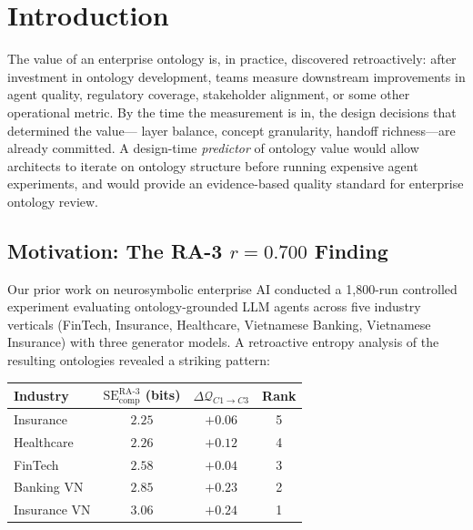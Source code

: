 \documentclass[11pt,a4paper]{article}
\newcommand{\se}{\mathrm{SE}}
\newcommand{\secomp}{\se_{\text{comp}}}
\newcommand{\quality}{\mathcal{Q}}
\begin{document}
\begin{abstract}
\medskip
\noindent \textbf{Keywords:} Structural entropy, ontology design,
enterprise AI, neurosymbolic AI, knowledge graphs, LLM agents, ontology
evaluation, information theory
\end{abstract}

\section{Introduction}
\label{sec:intro}

The value of an enterprise ontology is, in practice, discovered
retroactively: after investment in ontology development, teams measure
downstream improvements in agent quality, regulatory coverage,
stakeholder alignment, or some other operational metric. By the time the
measurement is in, the design decisions that determined the value---%
layer balance, concept granularity, handoff richness---are already
committed. A design-time \emph{predictor} of ontology value would allow
architects to iterate on ontology structure before running expensive
agent experiments, and would provide an evidence-based quality standard
for enterprise ontology review.

\subsection{Motivation: The RA-3 $r = 0.700$ Finding}

Our prior work on neurosymbolic enterprise AI
\citep{luong2026neurosymbolic} conducted a 1{,}800-run controlled
experiment evaluating ontology-grounded LLM agents across five industry
verticals (FinTech, Insurance, Healthcare, Vietnamese Banking,
Vietnamese Insurance) with three generator models. A retroactive entropy
analysis of the resulting ontologies revealed a striking pattern:

\begin{center}
\begin{tabular}{@{}lccc@{}}
\toprule
\textbf{Industry} & $\secomp^{\text{RA-3}}$ (bits) &
  $\Delta\quality_{C1 \to C3}$ & \textbf{Rank} \\
\midrule
Insurance         & $2.25$ & $+0.06$ & 5 \\
Healthcare        & $2.26$ & $+0.12$ & 4 \\
FinTech           & $2.58$ & $+0.04$ & 3 \\
Banking VN        & $2.85$ & $+0.23$ & 2 \\
Insurance VN      & $3.06$ & $+0.24$ & 1 \\
\bottomrule
\end{tabular}
\end{center}
\end{document}
